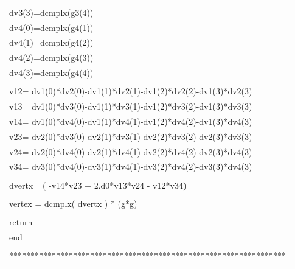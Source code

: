 \documentclass[a4paper,11pt]{article}
\begin{document}
\begin{center}
{\begin{supertabular}{l}
      \hspace{0.5em} dv3(3)=dcmplx(g3(4))\\
      \hspace{0.5em} dv4(0)=dcmplx(g4(1))\\
      \hspace{0.5em} dv4(1)=dcmplx(g4(2))\\
      \hspace{0.5em} dv4(2)=dcmplx(g4(3))\\
      \hspace{0.5em} dv4(3)=dcmplx(g4(4))\\
\\
      \hspace{0.5em} v12= dv1(0)*dv2(0)-dv1(1)*dv2(1)-dv1(2)*dv2(2)-dv1(3)*dv2(3)\\
      \hspace{0.5em} v13= dv1(0)*dv3(0)-dv1(1)*dv3(1)-dv1(2)*dv3(2)-dv1(3)*dv3(3)\\
      \hspace{0.5em} v14= dv1(0)*dv4(0)-dv1(1)*dv4(1)-dv1(2)*dv4(2)-dv1(3)*dv4(3)\\
      \hspace{0.5em} v23= dv2(0)*dv3(0)-dv2(1)*dv3(1)-dv2(2)*dv3(2)-dv2(3)*dv3(3)\\
      \hspace{0.5em} v24= dv2(0)*dv4(0)-dv2(1)*dv4(1)-dv2(2)*dv4(2)-dv2(3)*dv4(3)\\
      \hspace{0.5em} v34= dv3(0)*dv4(0)-dv3(1)*dv4(1)-dv3(2)*dv4(2)-dv3(3)*dv4(3)\\
\\
      \hspace{0.5em} dvertx =( -v14*v23 + 2.d0*v13*v24 - v12*v34)\\
\\
      \hspace{0.5em} vertex = dcmplx( dvertx ) * (g*g)\\
\\
      \hspace{0.5em} return\\
      \hspace{0.5em} end\\\\
  *****************************************************************\\
\end{supertabular}
}\\


\end{center}
\end{document}
